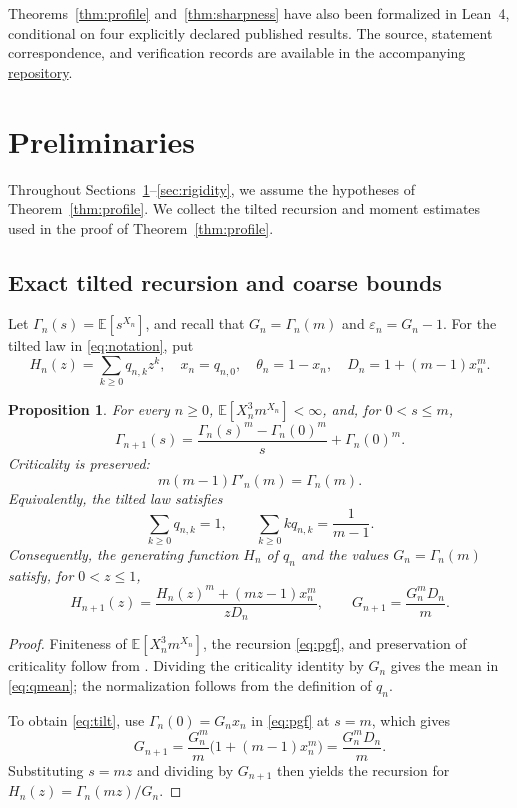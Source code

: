 \documentclass[11pt,letterpaper,reqno]{amsart}
\numberwithin{equation}{section}
\theoremstyle{plain}
\newtheorem{proposition}[theorem]{Proposition}
\theoremstyle{remark}
\newcommand{\E}{\mathbb E}\newcommand{\Pp}{\mathbb P}
\begin{document}
Theorems~\ref{thm:profile} and~\ref{thm:sharpness} have also been formalized
in Lean~4, conditional on four explicitly declared published results.
The source, statement correspondence, and verification records are available
in the accompanying \href{https://github.com/yszheng666/DR_Yaglom/tree/main/lean}{repository}.

\section{Preliminaries}\label{sec:prelim}
Throughout Sections~\ref{sec:prelim}--\ref{sec:rigidity}, we assume the hypotheses of Theorem~\ref{thm:profile}. We collect the tilted recursion and moment estimates used in the proof of Theorem~\ref{thm:profile}.

\subsection{Exact tilted recursion and coarse bounds}
Let $\Gamma_n(s)=\E[s^{X_n}]$, and recall that $G_n=\Gamma_n(m)$ and $\varepsilon_n=G_n-1$. For the tilted law in \eqref{eq:notation}, put
\[
 H_n(z)=\sum_{k\ge0}q_{n,k}z^k,\quad x_n=q_{n,0},\quad
 \theta_n=1-x_n,\quad D_n=1+(m-1)x_n^m.
\]

\begin{proposition}\label{prop:pgf}
For every $n\ge0$, $\E[X_n^3m^{X_n}]<\infty$, and, for $0<s\le m$,
\begin{equation}\label{eq:pgf}
 \Gamma_{n+1}(s)=\frac{\Gamma_n(s)^m-\Gamma_n(0)^m}{s}+\Gamma_n(0)^m.
\end{equation}
Criticality is preserved:
\[
 m(m-1)\Gamma'_n(m)=\Gamma_n(m).
\]
Equivalently, the tilted law satisfies
\begin{equation}\label{eq:qmean}
 \sum_{k\ge0}q_{n,k}=1,\qquad \sum_{k\ge0}kq_{n,k}=\frac1{m-1}.
\end{equation}
Consequently, the generating function $H_n$ of $q_n$ and the values $G_n=\Gamma_n(m)$ satisfy, for $0<z\le1$,
\begin{equation}\label{eq:tilt}
 H_{n+1}(z)=\frac{H_n(z)^m+(mz-1)x_n^m}{zD_n},\qquad
 G_{n+1}=\frac{G_n^mD_n}{m}.
\end{equation}
\end{proposition}
\begin{proof}
Finiteness of $\E[X_n^3m^{X_n}]$, the recursion \eqref{eq:pgf}, and preservation of criticality follow from \cite[Section~2.1, eqs.~(7)--(13)]{CDHLS}. Dividing the criticality identity by $G_n$ gives the mean in \eqref{eq:qmean}; the normalization follows from the definition of $q_n$.

To obtain \eqref{eq:tilt}, use $\Gamma_n(0)=G_nx_n$ in \eqref{eq:pgf} at $s=m$, which gives
\[
 G_{n+1}=\frac{G_n^m}{m}\bigl(1+(m-1)x_n^m\bigr)=\frac{G_n^mD_n}{m}.
\]
Substituting $s=mz$ and dividing by $G_{n+1}$ then yields the recursion for $H_n(z)=\Gamma_n(mz)/G_n$.
\end{proof}
\end{document}
